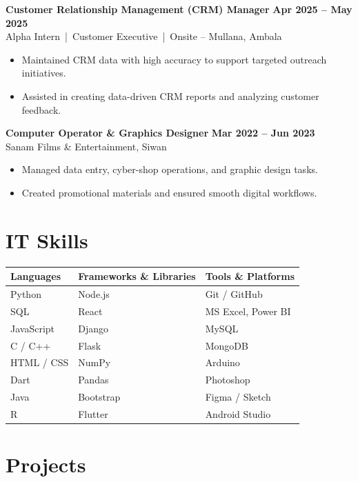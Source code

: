 \documentclass[11pt,a4paper]{article}
\begin{document}
\textbf{Customer Relationship Management (CRM) Manager} \hfill \textbf{Apr 2025 – May 2025} \\
Alpha Intern \,|\, Customer Executive \,|\, Onsite – Mullana, Ambala
\begin{itemize}[leftmargin=*]
\item Maintained CRM data with high accuracy to support targeted outreach initiatives.
\item Assisted in creating data-driven CRM reports and analyzing customer feedback.
\end{itemize}

\textbf{Computer Operator \& Graphics Designer} \hfill \textbf{Mar 2022 – Jun 2023} \\
Sanam Films \& Entertainment, Siwan
\begin{itemize}[leftmargin=*]
\item Managed data entry, cyber-shop operations, and graphic design tasks.
\item Created promotional materials and ensured smooth digital workflows.
\end{itemize}

\section*{IT Skills}

\begin{tabularx}{\textwidth}{X X X}
\textbf{Languages} & \textbf{Frameworks \& Libraries} & \textbf{Tools \& Platforms} \\ \hline
Python & Node.js & Git / GitHub \\
SQL & React & MS Excel, Power BI \\
JavaScript & Django & MySQL \\
C / C++ & Flask & MongoDB \\
HTML / CSS & NumPy & Arduino \\
Dart & Pandas & Photoshop \\
Java & Bootstrap & Figma / Sketch \\
R & Flutter & Android Studio \\
\end{tabularx}

\section*{Projects}
\end{document}
